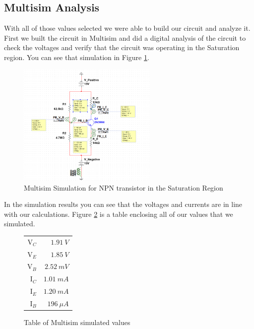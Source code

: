 \documentclass{article}
\begin{document}
\subsection{Multisim Analysis}

With all of those values selected we were able to build
our circuit and analyze it. First we built the circuit in
Multisim and did a digital analysis of the circuit to
check the voltages and verify that the circuit was 
operating in the Saturation region. You can see that
simulation in Figure \ref{fig:multisimPart2}.

\begin{figure}[h!]
  \begin{center}
  \includegraphics[width=0.6\textwidth]{Multisim Simulation Image Part 2.png}
  \caption{Multisim Simulation for NPN transistor
  in the Saturation Region}
  \label{fig:multisimPart2}
  \end{center}
\end{figure}

In the simulation results you can see that the voltages
and currents are in line with our calculations.
Figure \ref{table:satTableSim} is
a table enclosing all of our values that we simulated.

\begin{figure}
  \begin{center}
    \begin{tabular}{r|r}
      V$_C$ & $\SI{1.91}{V}$ \\
      V$_E$ & $\SI{1.85}{V}$ \\
      V$_B$ & $\SI{2.52}{mV}$ \\
      I$_C$ & $\SI{1.01}{mA}$ \\
      I$_E$ & $\SI{1.20}{mA}$ \\
      I$_B$ & $\SI{196}{\mu A}$ \\

    \end{tabular}
  \end{center}
  \caption{Table of Multisim simulated values}
  \label{table:satTableSim}
\end{figure}
\end{document}
